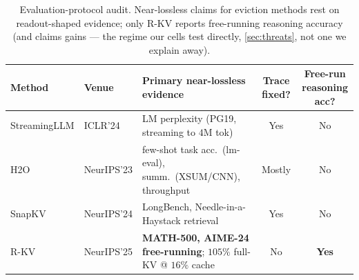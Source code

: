 \documentclass{article}
\begin{document}
\begin{table}[t]\centering
\caption{Evaluation-protocol audit. Near-lossless claims for eviction methods rest on
readout-shaped evidence; only R-KV reports free-running reasoning accuracy (and claims gains
--- the regime our cells test directly, \cref{sec:threats}, not one we explain away).}\label{tab:audit}\footnotesize
\setlength{\tabcolsep}{4pt}
\begin{tabular}{llp{5.6cm}cc}
\toprule
Method & Venue & Primary near-lossless evidence & Trace fixed? & \makecell{Free-run\\ reasoning acc?} \\
\midrule
StreamingLLM & ICLR'24 & LM perplexity (PG19, streaming to $4$M tok) & Yes & No \\
H2O & NeurIPS'23 & few-shot task acc.\ (lm-eval), summ.\ (XSUM/CNN), throughput & Mostly & No \\
SnapKV & NeurIPS'24 & LongBench, Needle-in-a-Haystack retrieval & Yes & No \\
R-KV & NeurIPS'25 & \textbf{MATH-500, AIME-24 free-running}; $105\%$ full-KV @ $16\%$ cache & No & \textbf{Yes} \\
\bottomrule
\end{tabular}\end{table}
\end{document}
